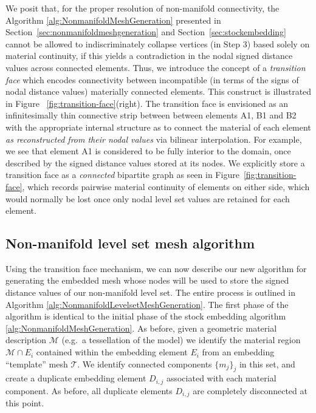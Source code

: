 We posit that, for the proper resolution of non-manifold connectivity,
the Algorithm \ref{alg:NonmanifoldMeshGeneration} presented in 
Section~\ref{sec:nonmanifoldmeshgeneration} and
Section~\ref{sec:stockembedding} cannot be allowed to
indiscriminately collapse vertices (in Step 3) based solely on
material continuity, if this yields a contradiction in the nodal
signed distance values across connected elements. Thus, we introduce
the concept of a \emph{transition face} which encodes connectivity
between incompatible (in terms of the signs of nodal distance values)
materially connected elements. This construct is illustrated in Figure
~\ref{fig:transition-face}(right). The transition face is envisioned
as an infinitesimally thin connective strip between between elements
\textsf{A1}, \textsf{B1} and \textsf{B2} with the appropriate internal
structure as to connect the material of each element \emph{as
  reconstructed from their nodal values} via bilinear
interpolation. For example, we see that element \textsf{A1} is
considered to be fully interior to the domain, once described by the
signed distance values stored at its nodes. We explicitly
  store a transition face as a \emph{connected} bipartite
graph as seen in Figure~\ref{fig:transition-face}, which
records pairwise material continuity of elements on
either side, which would normally be lost once only nodal level set
values are retained for each element.

\subsection{Non-manifold level set mesh algorithm}


Using the transition face mechanism, we can now describe our new
algorithm for generating the embedded mesh whose nodes will be used to
store the signed distance values of our non-manifold level set. The
entire process is outlined in Algorithm
\ref{alg:NonmanifoldLevelsetMeshGeneration}. The first phase of the
algorithm is identical to the initial phase of the stock embedding
algorithm \ref{alg:NonmanifoldMeshGeneration}. As before, given a
geometric material description $\mathcal{M}$ (e.g.\ a tessellation of
the model) we identify the material region $\mathcal{M}\cap E_i$
contained within the embedding element $E_i$ from an embedding
``template'' mesh $\mathcal{T}$. We identify connected components
$\{m_j\}_j$ in this set, and create a duplicate embedding element
$D_{i,j}$ associated with each material component. As before, all
duplicate elements $D_{i,j}$ are completely disconnected at this
point.

